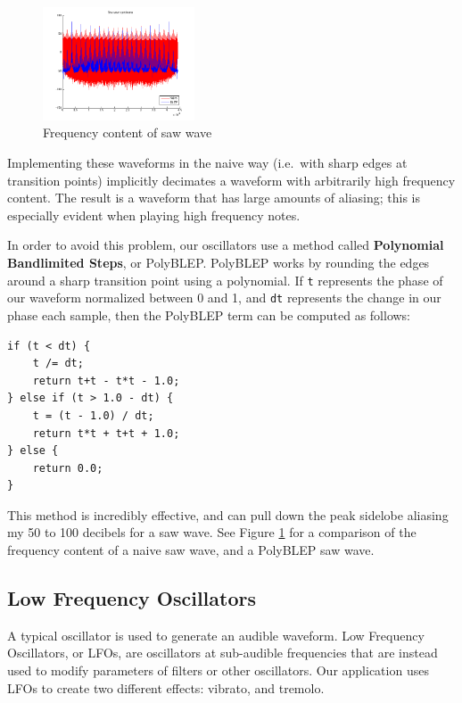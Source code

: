 \documentclass[letterpaper,12pt]{article}
\begin{document}
\begin{figure}
\centering
\includegraphics[width=0.4\textwidth]{figures/blep-spectrum.png}
\caption{Frequency content of saw wave}
\label{fig:polyblep-spectrum}
\end{figure}

Implementing these waveforms in the naive way (i.e.\ with sharp edges at transition points) implicitly decimates a waveform with arbitrarily high frequency content. The result is a waveform that has large amounts of aliasing; this is especially evident when playing high frequency notes.


In order to avoid this problem, our oscillators use a method called \textbf{Polynomial Bandlimited Steps}, or PolyBLEP\cite{polyblep}. PolyBLEP works by rounding the edges around a sharp transition point using a polynomial. If \texttt{t} represents the phase of our waveform normalized between 0 and 1, and \texttt{dt} represents the change in our phase each sample, then the PolyBLEP term can be computed as follows:

\begin{verbatim}
if (t < dt) {
    t /= dt;
    return t+t - t*t - 1.0;
} else if (t > 1.0 - dt) {
    t = (t - 1.0) / dt;
    return t*t + t+t + 1.0;
} else {
    return 0.0;
}
\end{verbatim}

This method is incredibly effective, and can pull down the peak sidelobe aliasing my 50 to 100 decibels for a saw wave. See Figure \ref{fig:polyblep-spectrum} for a comparison of the frequency content of a naive saw wave, and a PolyBLEP saw wave.


\subsection{Low Frequency Oscillators}

A typical oscillator is used to generate an audible waveform. Low Frequency Oscillators, or LFOs, are oscillators at sub-audible frequencies that are instead used to modify parameters of filters or other oscillators. Our application uses LFOs to create two different effects: vibrato, and tremolo.
\end{document}
